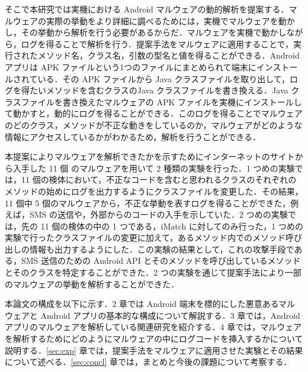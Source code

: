 そこで本研究では実機における Android マルウェアの動的解析を提案する．マルウェアの実際の挙動をより詳細に調べるためには，実機でマルウェアを動かし，その挙動から解析を行う必要があるからだ．マルウェアを実機で動かしながら，ログを得ることで解析を行う．提案手法をマルウェアに適用することで，実行されたメソッド名，クラス名，引数の型名と値を得ることができる．Android アプリは APK ファイルという1つのファイルにまとめられて端末にインストールされている．その APK ファイルから Java クラスファイルを取り出して，ログを得たいメソッドを含むクラスのJava クラスファイルを書き換える．Java クラスファイルを書き換えたマルウェアの APK ファイルを実機にインストールして動かすと，動的にログを得ることができる．このログを得ることでマルウェアのどのクラス，メソッドが不正な動きをしているのか，マルウェアがどのような情報にアクセスしているかがわかるため，解析を行うことができる．

本提案によりマルウェアを解析できたかを示すためにインターネットのサイトから入手した 11 個 のマルウェアを用いて 2 種類の実験を行った．1 つめの実験では，11 個の検体において，不正なコードを含むと思われるクラスのそれぞれのメソッドの始めにログを出力するようにクラスファイルを変更した．その結果，11 個中 5 個のマルウェアから，不正な挙動を表すログを得ることができた，例えば，SMS の送信や，外部からのコードの入手を示していた．2 つめの実験では，先の 11 個の検体の中の 1 つである，iMatch に対してのみ行った，1 つめの実験で行ったクラスファイルの変更に加えて，あるメソッド内でのメソッド呼び出しの情報も出力するようにした．この実験の結果として，これの攻撃手段である，SMS 送信のための Android API とそのメソッドを呼び出しているメソッドとそのクラスを特定することができた．2 つの実験を通じて提案手法により一部のマルウェアの挙動を解析することができた．

本論文の構成を以下に示す．2 章では Android 端末を標的にした悪意あるマルウェアと Android アプリの基本的な構成について解説する．3 章では，Android アプリのマルウェアを解析している関連研究を紹介する．4 章では，マルウェアを解析するためにどのようにマルウェアの中にログコードを挿入するかについて説明する．\ref{sec:exp} 章では，提案手法をマルウェアに適用させた実験とその結果について述べる．\ref{sec:concl} 章では，まとめと今後の課題について考察する．